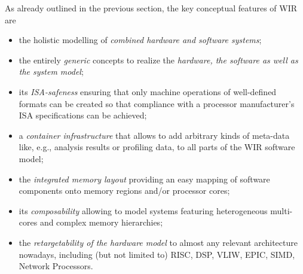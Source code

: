 As already outlined in the previous section, the key conceptual features of \gls{WIR} are
\begin{itemize}
  \item the holistic modelling of \textit{combined hardware and software systems};

  \item the entirely \textit{generic} concepts to realize the \textit{hardware, the software as well as the system model};

  \item its \textit{\gls{ISA}-safeness} ensuring that only machine operations of well-defined formats can be created so that compliance with a processor manufacturer's \gls{ISA} specifications can be achieved;

  \item a \textit{container infrastructure} that allows to add arbitrary kinds of meta-data like, e.g., analysis results or profiling data, to all parts of the \gls{WIR} software model;

  \item the \textit{integrated memory layout} providing an easy mapping of software components onto memory regions and/or processor cores;

  \item its \textit{composability} allowing to model systems featuring heterogeneous multi-cores and complex memory hierarchies;

  \item the \textit{retargetability of the hardware model} to almost any relevant architecture nowadays, including (but not limited to) \gls{RISC}, \gls{DSP}, \gls{VLIW}, \gls{EPIC}, \gls{SIMD}, Network Processors.
\end{itemize}

